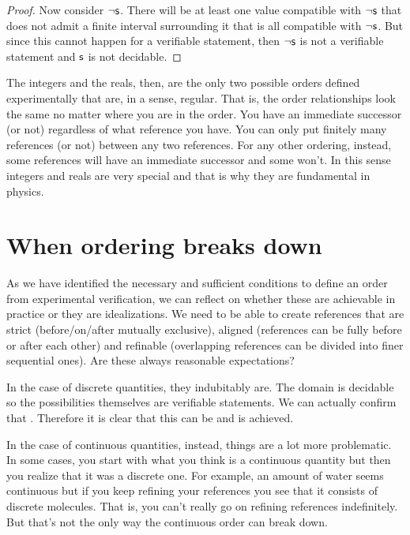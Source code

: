\documentclass[11pt,letterpaper,fleqn]{memoir} %
\begin{document}
\begin{mathSection}
\begin{proof}
	Now consider $\neg \mathsf{s}$. There will be at least one value compatible with $\neg \mathsf{s}$ that does not admit a finite interval surrounding it that is all compatible with $\neg \mathsf{s}$. But since this cannot happen for a verifiable statement, then $\neg \mathsf{s}$ is not a verifiable statement and $\mathsf{s}$ is not decidable.
\end{proof}
\end{mathSection}

The integers and the reals, then, are the only two possible orders defined experimentally that are, in a sense, regular. That is, the order relationships look the same no matter where you are in the order. You have an immediate successor (or not) regardless of what reference you have. You can only put finitely many references (or not) between any two references. For any other ordering, instead, some references will have an immediate successor and some won't. In this sense integers and reals are very special and that is why they are fundamental in physics.

\section{When ordering breaks down}

As we have identified the necessary and sufficient conditions to define an order from experimental verification, we can reflect on whether these are achievable in practice or they are idealizations. We need to be able to create references that are strict (before/on/after mutually exclusive), aligned (references can be fully before or after each other) and refinable (overlapping references can be divided into finer sequential ones). Are these always reasonable expectations?

In the case of discrete quantities, they indubitably are. The domain is decidable so the possibilities themselves are verifiable statements. We can actually confirm that . Therefore it is clear that this can be and is achieved.

In the case of continuous quantities, instead, things are a lot more problematic. In some cases, you start with what you think is a continuous quantity but then you realize that it was a discrete one. For example, an amount of water seems continuous but if you keep refining your references you see that it consists of discrete molecules. That is, you can't really go on refining references indefinitely. But that's not the only way the continuous order can break down.
\end{document}
